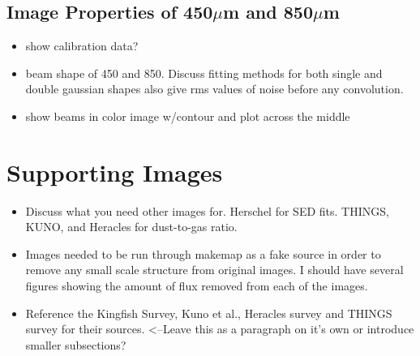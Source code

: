 \subsection{Image Properties of 450$\mu$m and 850$\mu$m}
\begin{itemize}
   \item show calibration data?
   \item beam shape of 450 and 850.  Discuss fitting methods for both single and double gaussian shapes also give rms values of noise before any convolution.
   \item show beams in color image w/contour and plot across the middle
\end{itemize}

\section{Supporting Images}

\begin{itemize}
  \item Discuss what you need other images for.  Herschel for SED fits.  THINGS, KUNO, and Heracles for dust-to-gas ratio.
  \item Images needed to be run through makemap as a fake source in order to remove any small scale structure from original images.  I should have several figures showing the amount of flux removed from each of the images.
  \item Reference the Kingfish Survey, Kuno et al., Heracles survey and THINGS survey for their sources.  <--Leave this as a paragraph on it's own or introduce smaller subsections?
  
\end{itemize}

